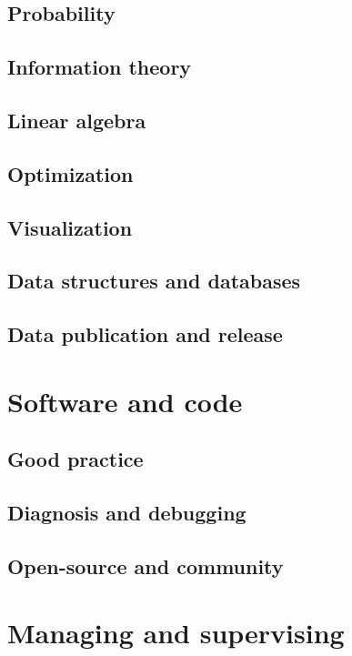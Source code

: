 \documentclass[letterpaper]{book}
\begin{document}
\chapter{Probability}

\chapter{Information theory}

\chapter{Linear algebra}

\chapter{Optimization}

\chapter{Visualization}

\chapter{Data structures and databases}

\chapter{Data publication and release}

\part{Software and code}

\chapter{Good practice}

\chapter{Diagnosis and debugging}

\chapter{Open-source and community}

\part{Managing and supervising}
\end{document}
